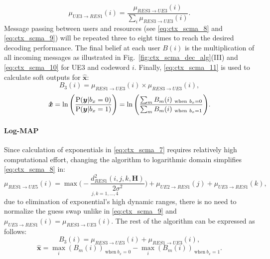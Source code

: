 \begin{equation}
  \label{eq:ctx_scma_9}
  \mu_{UE3 \rightarrow RES1}(i) = \frac{\mu_{RES3 \rightarrow UE3}(i)}
  {\sum_i\mu_{RES3 \rightarrow UE3}(i)}.
\end{equation}
Message passing between users and resources (see \eqref{eq:ctx_scma_8} and
\eqref{eq:ctx_scma_9}) will be repeated three to eight times to reach the
desired decoding performance. The final belief at each user $B(i)$ is the
multiplication of all incoming messages as illustrated in
Fig.~{\ref{fig:ctx_scma_dec_alg}}(III) and \eqref{eq:ctx_scma_10} for UE3 and
codeword $i$. Finally, \eqref{eq:ctx_scma_11} is used to calculate soft outputs
for $\bm{\hat{x}}$:
\begin{equation}
  \label{eq:ctx_scma_10}
  B_3(i) = \mu_{RES1 \rightarrow UE3}(i) \times \mu_{RES3 \rightarrow UE3}(i),
\end{equation}
\begin{equation}
  \label{eq:ctx_scma_11}
  \bm{\hat{x}} = \ln \Bigg( \frac{\operatorname{P}(\bm{y}|b_x=0)}{\operatorname{P}(\bm{y}|b_x=1)} \Bigg) =
  \ln \Bigg( \frac{\sum_m B_m(i)_{~\text{when}~b_x=0}}{\sum_m B_m(i)_{~\text{when}~b_x=1}}
  \Bigg).
\end{equation}

\paragraph{Log-MAP}
\label{sec:ctx_scma_log-map}

Since calculation of exponentials in \eqref{eq:ctx_scma_7} requires relatively
high computational effort, changing the algorithm to logarithmic domain
simplifies \eqref{eq:ctx_scma_8} in:
\begin{equation}
  \label{eq:ctx_scma_13}
  \mu_{RES1 \rightarrow UE5}(i) = \underset{j,k=1,...,4}
  {\max \Bigg(-\frac{d_{RES1}^2(i,j,k,\bm{H})}{2\sigma^2} \Bigg)} +
  \mu_{UE2 \rightarrow RES1}(j) + \mu_{UE3 \rightarrow RES1}(k),
\end{equation}
due to elimination of exponential's high dynamic ranges, there is no need to
normalize the guess swap unlike in \eqref{eq:ctx_scma_9} and
$\mu_{UE3 \rightarrow RES1}(i) = \mu_{RES3 \rightarrow UE3}(i).$
The rest of the algorithm can be expressed as follows:
\begin{equation}
  \label{eq:ctx_scma_15}
  B_3(i) = \mu_{RES3 \rightarrow UE3}(i) + \mu_{RES1 \rightarrow UE3}(i),
\end{equation}
\begin{equation}
  \label{eq:ctx_scma_16}
  \bm{\hat{x}} = \max_i(B_m(i))_{~\text{when}~b_x=0} - \max_i(B_m(i))_{~\text{when}~b_x=1}.
\end{equation}

